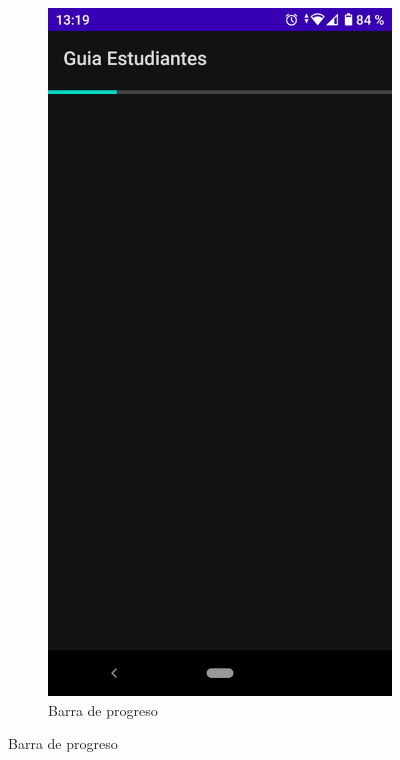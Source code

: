 \documentclass[a4paper,11pt]{article}
\begin{document}
\begin{figure}[H]
\begin{subfigure}{0.5\textwidth}
  \centering
  \includegraphics[width=1\linewidth]{imagenes/progressBar.jpeg}  
  \caption{Barra de progreso}

\end{subfigure}
\end{figure}
\end{document}
